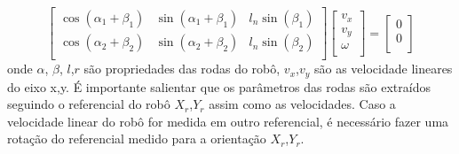 \[
\begin{bmatrix}
    \cos(\alpha_{1} + \beta_{1}) &  \sin(\alpha_{1} + \beta_{1}) &  l_n\sin(\beta_{1}) \\
    \cos(\alpha_{2} + \beta_{2}) &  \sin(\alpha_{2} + \beta_{2})  &  l_n\sin(\beta_{2})\\
\end{bmatrix}
\begin{bmatrix}
    v_x \\
    v_y \\
    \omega\\
\end{bmatrix}
=
\begin{bmatrix}
    0 \\
    0 \\
\end{bmatrix}
\]
onde $\alpha$, $\beta$, $l$,$r$ são propriedades das rodas do robô,
$v_x$,$v_y$ são as velocidade lineares do eixo x,y.
É importante salientar que os parâmetros das
rodas são extraídos seguindo o referencial do robô $X_r$,$Y_r$ assim como
as velocidades. Caso a velocidade linear do robô for medida em outro
referencial, é necessário fazer uma rotação do referencial
medido para a orientação $X_r$,$Y_r$.

